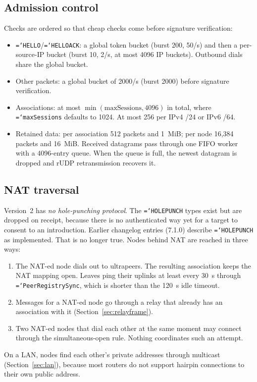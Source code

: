 \documentclass[11pt,a4paper]{article}
\newcommand{\code}[1]{\texttt{\hyphenchar\font=`\-\relax #1}}
\DeclareRobustCommand{\_}{\origunderscore\allowbreak}
\begin{document}
\subsection{Admission control}
Checks are ordered so that cheap checks come before signature verification:
\begin{itemize}
\item \code{HELLO}/\code{HELLO\_ACK}: a global token bucket (burst 200, 50/s) and then a
  per-source-IP bucket (burst 10, 2/s, at most 4096 IP buckets). Outbound dials share the
  global bucket.
\item Other packets: a global bucket of 2000/s (burst 2000) before signature verification.
\item Associations: at most $\min(\text{maxSessions}, 4096)$ in total, where
  \code{maxSessions} defaults to 1024. At most 256 per IPv4 /24 or IPv6 /64.
\item Retained data: per association 512 packets and 1~MiB; per node 16{,}384 packets and
  16~MiB. Received datagrams pass through one FIFO worker with a 4096-entry queue. When the
  queue is full, the newest datagram is dropped and rUDP retransmission recovers it.
\end{itemize}

\subsection{NAT traversal}
Version~2 has \emph{no hole-punching protocol}. The \code{HOLE\_PUNCH} types exist but are
dropped on receipt, because there is no authenticated way yet for a target to consent to an
introduction. Earlier changelog entries (7.1.0) describe \code{HOLE\_PUNCH} as implemented.
That is no longer true. Nodes behind NAT are reached in three ways:
\begin{enumerate}
\item The NAT-ed node dials out to ultrapeers. The resulting association keeps the NAT
  mapping open. Leaves ping their uplinks at least every 30~s through \code{PeerRegistrySync},
  which is shorter than the 120~s idle timeout.
\item Messages for a NAT-ed node go through a relay that already has an association with it
  (Section~\ref{sec:relayframe}).
\item Two NAT-ed nodes that dial each other at the same moment may connect through the
  simultaneous-open rule. Nothing coordinates such an attempt.
\end{enumerate}
On a LAN, nodes find each other's private addresses through multicast
(Section~\ref{sec:lan}), because most routers do not support hairpin connections to their own
public address.
\end{document}
